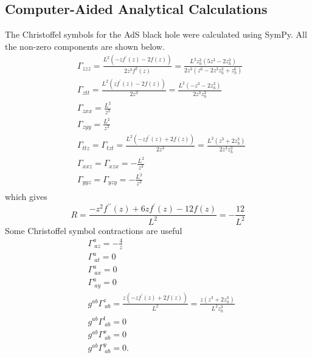 \documentclass[12pt]{report}
\newcommand{\sympy}{SymPy}
\begin{document}
\begin{appendices}
\section{Computer-Aided Analytical Calculations\label{CAS}}
The Christoffel symbols for the AdS black hole were calculated using \sympy. All the non-zero components are shown below.
\begin{equation}
\begin{split}
&
\Gamma_{zzz}=\frac{L^{2} \left(- z f^\prime\left(z\right) - 2 f\left(z\right)\right)}{2 z^{3} f^{2}\left(z\right)}=\frac{L^{2} z_h^{3} \left(5 z^{3} - 2 z_h^{3}\right)}{2 z^{3} \left(z^{6} - 2 z^{3} z_h^{3} + z_h^{6}\right)}\\
&
\Gamma_{ztt}=\frac{L^{2} \left(z f^\prime\left(z\right) - 2 f\left(z\right)\right)}{2 z^{3}}=\frac{L^{2} \left(- z^{3} - 2 z_h^{3}\right)}{2 z^{3} z_h^{3}}\\
&
\Gamma_{zxx}=\frac{L^{2}}{z^{3}}\\
&
\Gamma_{zyy}=\frac{L^{2}}{z^{3}}\\
&
\Gamma_{ttz}=
\Gamma_{tzt}=\frac{L^{2} \left(- z f^\prime\left(z\right) + 2 f\left(z\right)\right)}{2 z^{3}}=\frac{L^{2} \left(z^{3} + 2 z_h^{3}\right)}{2 z^{3} z_h^{3}}\\
&
\Gamma_{xxz}=
\Gamma_{xzx}=- \frac{L^{2}}{z^{3}}\\
&
\Gamma_{yyz}=
\Gamma_{yzy}=- \frac{L^{2}}{z^{3}}\\
\end{split}\label{CS}
\end{equation}
which gives
\begin{equation}
 R=\frac{- z^{2} f^{\prime\prime}\left(z\right) + 6 z f^\prime\left(z\right) - 12 f\left(z\right)}{L^{2}}=- \frac{12}{L^{2}}
\end{equation}
Some Christoffel symbol contractions are useful
\begin{equation}
\begin{split}
&\Gamma^a_{\ az}=- \frac{4}{z}\\
&\Gamma^a_{\ at}=0\\
&\Gamma^a_{\ ax}=0\\
&\Gamma^a_{\ ay}=0\\
&g^{ab}\Gamma^z_{\ ab}=\frac{z \left(- z f^\prime\left(z\right) + 2 f\left(z\right)\right)}{L^{2}}=\frac{z \left(z^{3} + 2 z_h^{3}\right)}{L^{2} z_h^{3}}\\
&g^{ab}\Gamma^t_{\ ab}=0\\
&g^{ab}\Gamma^x_{\ ab}=0\\
&g^{ab}\Gamma^y_{\ ab}=0.

\end{split}
\end{equation}
\end{appendices}
\end{document}
